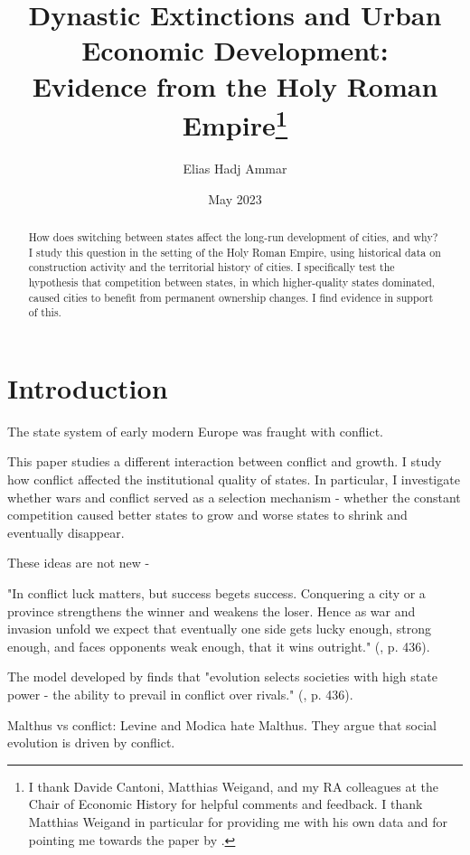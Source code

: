 \documentclass{article}
\title{Dynastic Extinctions and Urban Economic Development: \\Evidence from the Holy Roman Empire\footnote{
I thank Davide Cantoni, Matthias Weigand, and my RA colleagues at the Chair of Economic History for helpful comments and feedback. I thank Matthias Weigand in particular for providing me with his own data and for pointing me towards the paper by \cite{schoenholzer2022}.
}
}
\author{Elias Hadj Ammar}
\date{May 2023}
\begin{document}
\onehalfspacing
\maketitle
\thispagestyle{empty}

\begin{abstract}
How does switching between states affect the long-run development of cities, and why? I study this question in the setting of the Holy Roman Empire, using historical data on construction activity and the territorial history of cities. I specifically test the hypothesis that competition between states, in which higher-quality states dominated, caused cities to benefit from permanent ownership changes. I find evidence in support of this.
\end{abstract}

\newpage

\setcounter{page}{1}
\doublespacing



\section{Introduction}

The state system of early modern Europe was fraught with conflict. 

This paper studies a different interaction between conflict and growth. I study how conflict affected the institutional quality of states. In particular, I investigate whether wars and conflict served as a selection mechanism - whether the constant competition caused better states to grow and worse states to shrink and eventually disappear. 


These ideas are not new - 


"In conflict luck matters, but success begets success. Conquering a city or a province strengthens the winner and weakens the loser. Hence as war and invasion unfold we expect that eventually one side gets lucky enough, strong enough, and faces opponents weak enough, that it wins outright." (\citealp{levine2021}, p. 436).

The model developed by \cite{levine2013} finds that "evolution selects societies with high state power - the ability to prevail in conflict over rivals." (\citealp{levine2021}, p. 436).


Malthus vs conflict: Levine and Modica hate Malthus. They argue that social evolution is driven by conflict.
\end{document}
